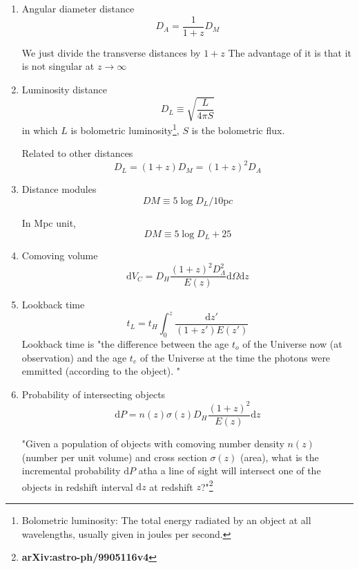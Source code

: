 \documentclass[11pt]{book}
\begin{document}
\begin{enumerate}
\item
Angular diameter distance
\begin{equation}
	D_A = \frac {1}{1+z} D_M
\end{equation}

We just divide the transverse distances by $1+z$
The advantage of it is that it is not singular at $z\rightarrow\infty$

\item
Luminosity distance
\begin{equation}
	D_L\equiv \sqrt{\frac{L}{4\pi S}}
\end{equation}
in which $L$ is bolometric luminosity\footnote{Bolometric luminosity: The total energy radiated by an object at all wavelengths, usually given in joules per second.}, $S$ is the bolometric flux.

Related to other distances
\begin{equation}
	D_L = (1+z)D_M = (1+z)^2 D_A
\end{equation}

\item
Distance modules
\begin{equation}
	DM \equiv 5 \log{D_L/10\mathrm pc}
\end{equation}

In Mpc unit,
\begin{equation}
	DM \equiv 5 \log{D_L} + 25
\end{equation}

\item
Comoving volume
\begin{equation}
	\mathrm dV_C = D_H \frac{(1+z)^2D_\Lambda^2}{E(z)}\mathrm d\Omega \mathrm dz
\end{equation}

\item
Lookback time
\begin{equation}
	t_L = t_H \int_0^z \frac{\mathrm dz'}{(1+z')E(z')}
\end{equation}
Lookback time is "the difference between the age $t_o$ of the Universe now (at observation) and the age $t_e$ of the Universe at the time the photons were emmitted (according to the object). "

\item
Probability of intersecting objects
\begin{equation}
	\mathrm dP = n(z)\sigma(z)D_H\frac{(1+z)^2}{E(z)}\mathrm dz
\end{equation}

"Given a population of objects with comoving number density $n(z)$ (number per unit volume) and cross section $\sigma(z)$ (area), what is the incremental probability $\mathrm dP$ atha a line of sight will intersect one of the objects in redshift interval $\mathrm dz$ at redshift $z$?"\footnote{{\bf arXiv:astro-ph/9905116v4}}


\end{enumerate}
\end{document}
